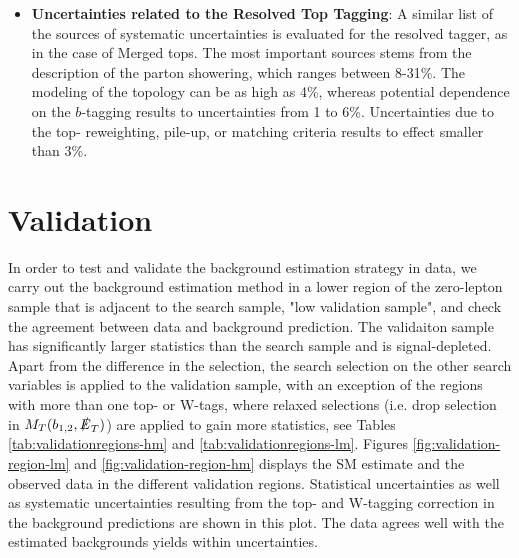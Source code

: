 \begin{itemize}
	\item \textbf{Uncertainties related to the Resolved Top Tagging}: A similar list of the sources of systematic uncertainties is evaluated for the resolved tagger, as in the case of Merged tops. The most important sources stems from the description of the parton showering, which ranges between 8-31\%. The modeling of the \ttbar{} topology can be as high as 4\%, whereas potential dependence on the $b$-tagging results to uncertainties from 1 to 6\%. Uncertainties due to the top-\pt{} reweighting, pile-up, or matching criteria results to effect smaller than 3\%. 
\end{itemize}

\section{Validation}\label{sec:Validation}



In order to test and validate the background estimation strategy in data, we carry out the background estimation method in a lower \met{} region of the zero-lepton sample that is adjacent to the search sample, "low \met{} validation sample", and check the agreement between data and background prediction. The validaiton sample has significantly larger statistics than the search sample and is signal-depleted. Apart from the difference in the \met{} selection, the search selection on the other search variables is applied to the validation sample, with an exception of the regions with more than one top- or W-tags, where relaxed selections (i.e. drop selection in $M_T(b_{1,2},\slashed{E}_{T})$) are applied to gain more statistics, see Tables \ref{tab:validationregions-hm} and \ref{tab:validationregions-lm}. Figures \ref{fig:validation-region-lm} and \ref{fig:validation-region-hm} displays the SM estimate and the observed data in the different validation regions. Statistical uncertainties as well as systematic uncertainties resulting from the top- and W-tagging correction in the background predictions are shown in this plot. The data agrees well with the estimated backgrounds yields within uncertainties. 

